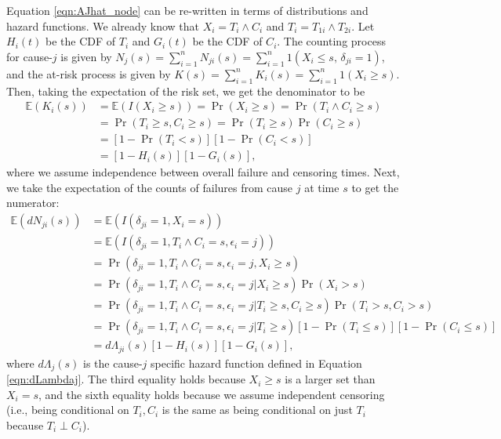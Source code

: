 Equation \cref{eqn:AJhat_node} can be re-written in terms of distributions and hazard functions. We already know that $X_i = T_i \wedge C_i$ and $T_i = T_{1i} \wedge T_{2i}$. Let $H_i(t)$ be the CDF of $T_i$ and $G_i(t)$ be the CDF of $C_i$. 
The counting process for cause-$j$ is given by $N_j(s) = \sum_{i=1}^{n} N_{ji}(s) = \sum_{i=1}^{n} 1(X_i \leq s, \, \delta_{ji} = 1)$, and the at-risk process is given by
$ K(s) = \sum_{i=1}^{n} K_i(s) = \sum_{i=1}^{n} 1(X_i \geq s)$. Then, taking the expectation of the risk set, we get the denominator to be
\begin{equation}
\begin{split}
\mathbb{E}(K_i(s)) &= \mathbb{E}(I(X_i \geq s)) = \Pr(X_i \geq s) = \Pr(T_i \wedge C_i \geq s) \\
&= \Pr(T_i \geq s, C_i \geq s) = \Pr(T_i \geq s) \Pr(C_i \geq s) \\
&=[1-\Pr(T_i < s)][1 - \Pr(C_i < s)]\\
&= [1-H_i(s)][1-G_i(s)],
\end{split}
\end{equation}
where we assume independence between overall failure and censoring times.
Next, we take the expectation of the counts of failures from cause $j$ at time $s$ to get the numerator:
\begin{equation}
    \begin{split}
\mathbb{E}(dN_{ji}(s)) &= \mathbb{E}(I(\delta_{ji} = 1, X_i = s)) \\ 
&= \mathbb{E}(I(\delta_{ji} = 1, T_i \wedge C_i = s, \epsilon_i = j)) \\ 
&= \Pr(\delta_{ji} = 1, T_i \wedge C_i = s, \epsilon_i = j, X_i \geq s) \\
&= \Pr(\delta_{ji} = 1, T_i \wedge C_i = s, \epsilon_i = j | X_i \geq s) \Pr(X_i > s)\\
&= \Pr(\delta_{ji} = 1, T_i \wedge C_i = s, \epsilon_i = j | T_i \geq s, C_i \geq s) \Pr(T_i > s, C_i > s)\\
&= \Pr(\delta_{ji} = 1, T_i \wedge C_i = s, \epsilon_i = j | T_i \geq s) [1-\Pr(T_i \leq s)][1 - \Pr(C_i \leq s)]\\
&= d\Lambda_{ji}(s)[1-H_i(s)][1-G_i(s)],
\end{split}
\end{equation}
where $d\Lambda_j(s)$ is the cause-$j$ specific hazard function defined in Equation \cref{eqn:dLambdaj}. The third equality holds because $X_i \geq s$ is a larger set than $X_i = s$, and the sixth equality holds because we assume independent censoring (i.e., being conditional on $T_i,C_i$ is the same as being conditional on just $T_i$ because $T_i \perp C_i$).

